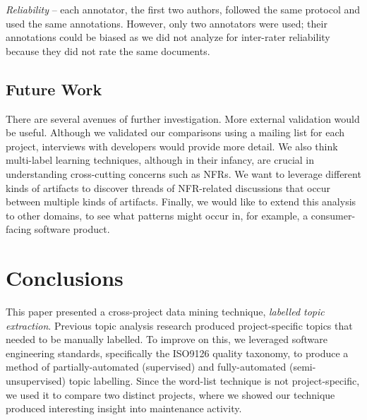 \documentclass[smallextended]{svjour3}       %
\begin{document}
\emph{Reliability} -- each annotator, the first two authors, followed the same protocol and used the same annotations. 
However, only two annotators were used; their annotations could be
biased as we did not analyze for inter-rater reliability because they
did not rate the same documents.

\subsection{Future Work}
There are several avenues of further investigation.  
More external validation would be useful. 
Although we validated our comparisons using a mailing list for each project, interviews with developers would provide more detail. 
We also think multi-label learning techniques, although in their infancy, are crucial in understanding cross-cutting concerns such as NFRs. 
We want to leverage different kinds of artifacts to discover threads of NFR-related discussions that occur between multiple kinds of artifacts.
Finally, we would like to extend this analysis to other domains, to see what patterns might occur in, for example, a consumer-facing software product.

\section{Conclusions}
This paper presented a cross-project data mining technique,
\emph{labelled topic extraction}. %
Previous topic analysis research produced project-specific
topics that needed to be manually labelled.
To improve on this, we leveraged software engineering standards,
specifically the ISO9126 quality taxonomy, to produce a method of partially-automated (supervised) and fully-automated (semi-unsupervised) topic labelling.
Since the word-list technique is not project-specific, we used it to compare two distinct projects, where we showed our technique produced interesting
insight into maintenance activity. %
\end{document}
